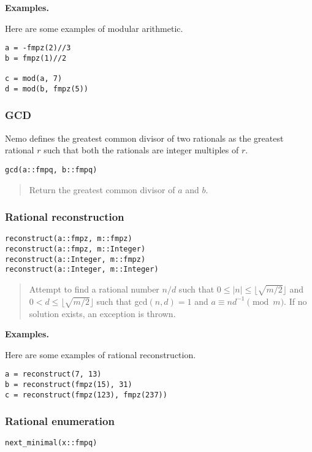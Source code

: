 \documentclass[a4paper,10pt]{article}
\newcommand{\desc}[1]{\vspace{-3mm}\begin{quote}#1\end{quote}}
\begin{document}
{{\textbf{Examples.}

Here are some examples of modular arithmetic.

\begin{lstlisting}
a = -fmpz(2)//3
b = fmpz(1)//2

c = mod(a, 7)
d = mod(b, fmpz(5))
\end{lstlisting}

\subsubsection{GCD}

Nemo defines the greatest common divisor of two rationals as the greatest rational $r$
such that both the rationals are integer multiples of $r$.

\begin{lstlisting}
gcd(a::fmpq, b::fmpq)
\end{lstlisting}

\desc{Return the greatest common divisor of $a$ and $b$.}

\subsubsection{Rational reconstruction}

\begin{lstlisting}
reconstruct(a::fmpz, m::fmpz)
reconstruct(a::fmpz, m::Integer)
reconstruct(a::Integer, m::fmpz)
reconstruct(a::Integer, m::Integer)
\end{lstlisting}

\desc{Attempt to find a rational number $n/d$ such that 
$0 \leq |n| \leq \lfloor\sqrt{m/2}\rfloor$ and 
$0 < d \leq \lfloor\sqrt{m/2}\rfloor$ such that gcd$(n, d) = 1$ and
$a \equiv nd^{-1} \pmod{m}$. If no solution exists, an exception is thrown.}

\textbf{Examples.}

Here are some examples of rational reconstruction.

\begin{lstlisting}
a = reconstruct(7, 13)
b = reconstruct(fmpz(15), 31)
c = reconstruct(fmpz(123), fmpz(237))
\end{lstlisting}

\subsubsection{Rational enumeration}

\begin{lstlisting}
next_minimal(x::fmpq)
\end{lstlisting}

}}
\end{document}
